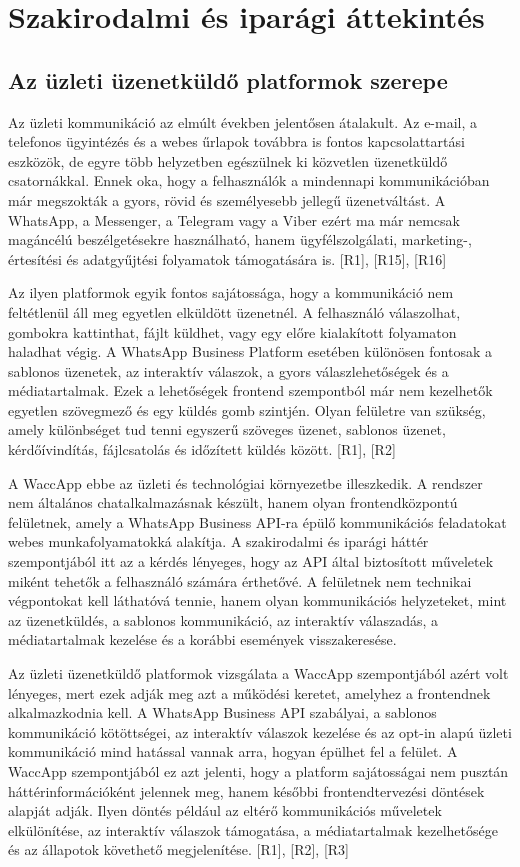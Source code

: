 \chapter{Szakirodalmi és iparági áttekintés}

\section{Az üzleti üzenetküldő platformok szerepe}

Az üzleti kommunikáció az elmúlt években jelentősen átalakult. Az e-mail, a telefonos ügyintézés és a webes űrlapok továbbra is fontos kapcsolattartási eszközök, de egyre több helyzetben egészülnek ki közvetlen üzenetküldő csatornákkal. Ennek oka, hogy a felhasználók a mindennapi kommunikációban már megszokták a gyors, rövid és személyesebb jellegű üzenetváltást. A WhatsApp, a Messenger, a Telegram vagy a Viber ezért ma már nemcsak magáncélú beszélgetésekre használható, hanem ügyfélszolgálati, marketing-, értesítési és adatgyűjtési folyamatok támogatására is. [R1], [R15], [R16]

Az ilyen platformok egyik fontos sajátossága, hogy a kommunikáció nem feltétlenül áll meg egyetlen elküldött üzenetnél. A felhasználó válaszolhat, gombokra kattinthat, fájlt küldhet, vagy egy előre kialakított folyamaton haladhat végig. A WhatsApp Business Platform esetében különösen fontosak a sablonos üzenetek, az interaktív válaszok, a gyors válaszlehetőségek és a médiatartalmak. Ezek a lehetőségek frontend szempontból már nem kezelhetők egyetlen szövegmező és egy küldés gomb szintjén. Olyan felületre van szükség, amely különbséget tud tenni egyszerű szöveges üzenet, sablonos üzenet, kérdőívindítás, fájlcsatolás és időzített küldés között. [R1], [R2]

A WaccApp ebbe az üzleti és technológiai környezetbe illeszkedik. A rendszer nem általános chatalkalmazásnak készült, hanem olyan frontendközpontú felületnek, amely a WhatsApp Business API-ra épülő kommunikációs feladatokat webes munkafolyamatokká alakítja. A szakirodalmi és iparági háttér szempontjából itt az a kérdés lényeges, hogy az API által biztosított műveletek miként tehetők a felhasználó számára érthetővé. A felületnek nem technikai végpontokat kell láthatóvá tennie, hanem olyan kommunikációs helyzeteket, mint az üzenetküldés, a sablonos kommunikáció, az interaktív válaszadás, a médiatartalmak kezelése és a korábbi események visszakeresése.

Az üzleti üzenetküldő platformok vizsgálata a WaccApp szempontjából azért volt lényeges, mert ezek adják meg azt a működési keretet, amelyhez a frontendnek alkalmazkodnia kell. A WhatsApp Business API szabályai, a sablonos kommunikáció kötöttségei, az interaktív válaszok kezelése és az opt-in alapú üzleti kommunikáció mind hatással vannak arra, hogyan épülhet fel a felület. A WaccApp szempontjából ez azt jelenti, hogy a platform sajátosságai nem pusztán háttérinformációként jelennek meg, hanem későbbi frontendtervezési döntések alapját adják. Ilyen döntés például az eltérő kommunikációs műveletek elkülönítése, az interaktív válaszok támogatása, a médiatartalmak kezelhetősége és az állapotok követhető megjelenítése. [R1], [R2], [R3]

